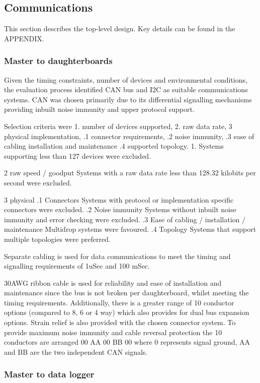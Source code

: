 \subsection{Communications}
This section describes the top-level design. Key details can be found in the APPENDIX.

\subsubsection{Master to daughterboards} 
Given the timing constraints, number of devices and environmental conditions, the evaluation process identified CAN bus and I2C as suitable communications systems.
CAN was chosen primarily due to its differential signalling mechanisms providing inbuilt noise immunity and upper protocol support. 

Selection criteria were 1. number of devices supported, 2. raw data rate, 3 physical implementation, .1 connector requirements, .2 noise immunity, .3 ease of cabling installation and maintenance .4 supported topology. 
1. Systems supporting less than 127 devices were excluded.

2 raw speed / goodput
Systems with a raw data rate less than 128.32 kilobits per second were excluded.

3 physical
.1 Connectors
Systems with protocol or implementation specific connectors were excluded.
.2 Noise immunity 
Systems without inbuilt noise immunity and error checking were excluded.
.3 Ease of cabling / installation / maintenance 
Multidrop systems were favoured.
.4 Topology 
Systems that support multiple topologies were preferred.



Separate cabling is used for data communications to meet the timing and signalling requirements of 1uSec and 100 mSec.

30AWG ribbon cable is used for reliability and ease of installation and maintenance since the bus is not broken per daughterboard, whilst meeting the timing requirements. Additionally, there is a greater range of 10 conductor options (compared to 8, 6 or 4 way) which also provides for dual bus expansion options. Strain relief is also provided with the chosen connector system. To provide maximum noise immunity and cable reversal protection the 10 conductors are arranged 00 AA 00 BB 00 where 0 represents signal ground, AA and BB are the two independent CAN signals. 


\subsubsection{Master to data logger}
